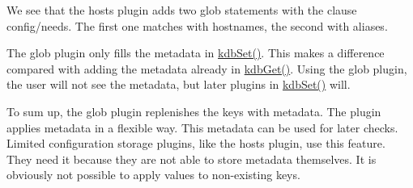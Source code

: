 We see that the {\ttfamily hosts} plugin adds two glob statements with the clause {\ttfamily config/needs}. The first one matches with hostnames, the second with aliases.

The glob plugin only fills the metadata in {\ttfamily \hyperlink{group__kdb_ga11436b058408f83d303ca5e996832bcf}{kdb\+Set()}}. This makes a difference compared with adding the metadata already in {\ttfamily \hyperlink{group__kdb_ga28e385fd9cb7ccfe0b2f1ed2f62453a1}{kdb\+Get()}}. Using the glob plugin, the user will not see the metadata, but later plugins in {\ttfamily \hyperlink{group__kdb_ga11436b058408f83d303ca5e996832bcf}{kdb\+Set()}} will.

To sum up, the glob plugin replenishes the keys with metadata. The plugin applies metadata in a flexible way. This metadata can be used for later checks. Limited configuration storage plugins, like the {\ttfamily hosts} plugin, use this feature. They need it because they are not able to store metadata themselves. It is obviously not possible to apply values to non-\/existing keys. 